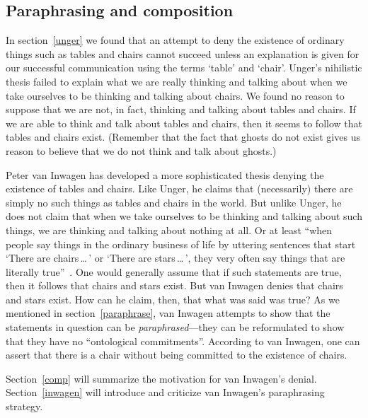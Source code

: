 \documentclass[11pt]{article}
\begin{document}
\begin{spacing}{1.5}
\section{Paraphrasing and composition}
In section~\ref{unger} we found that an attempt to deny the existence of ordinary things such as tables and chairs cannot succeed unless an explanation is given for our successful communication using the terms `table' and `chair'.  Unger's nihilistic thesis failed to explain what we are really thinking and talking about when we take ourselves to be thinking and talking about chairs.  We found no reason to suppose that we are not, in fact, thinking and talking about tables and chairs.  If we are able to think and talk about tables and chairs, then it seems to follow that tables and chairs exist.  (Remember that the fact that ghosts do not exist gives us reason to believe that we do not think and talk about ghosts.)

Peter van Inwagen has developed a more sophisticated thesis denying the existence of tables and chairs.  Like Unger, he claims that (necessarily) there are simply no such things as tables and chairs in the world.  But unlike Unger, he does not claim that when we take ourselves to be thinking and talking about such things, we are thinking and talking about nothing at all.  Or at least ``when people say things in the ordinary business of life by uttering sentences that start `There are chairs\,\ldots\,' or `There are stars\,\ldots\,', they very often say things that are literally true''~\citep[102]{inwagen1995}.  One would generally assume that if such statements are true, then it follows that chairs and stars exist.  But van Inwagen denies that chairs and stars exist.  How can he claim, then, that what was said was true? As we mentioned in section~\ref{paraphrase}, van Inwagen attempts to show that the statements in question can be {\em paraphrased}---they can be reformulated to show that they have no ``ontological commitments''.  According to van Inwagen, one can assert that there is a chair without being committed to the existence of chairs.

Section~\ref{comp} will summarize the motivation for van Inwagen's denial.  Section~\ref{inwagen} will introduce and criticize van Inwagen's paraphrasing strategy.


\end{spacing}
\end{document}
